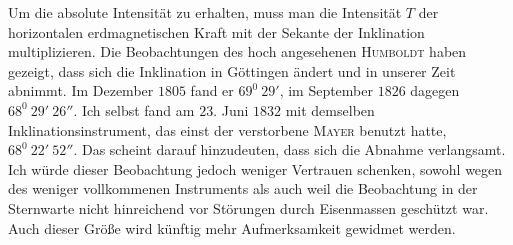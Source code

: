 Um die absolute Intensität zu erhalten, muss man die Intensität $T$ der horizontalen erdmagnetischen Kraft mit der Sekante der Inklination multiplizieren. Die Beobachtungen des hoch angesehenen \textsc{Humboldt} haben gezeigt, dass sich die Inklination in Göttingen ändert und in unserer Zeit abnimmt. Im Dezember $1805$ fand er $69^0\ 29'$, im September $1826$ dagegen $68^0\ 29'\ 26''$. Ich selbst fand am $23$. Juni $1832$ mit demselben Inklinationsinstrument, das einst der verstorbene \textsc{Mayer} benutzt hatte, $68^0\ 22'\ 52''$. Das scheint darauf hinzudeuten, dass sich die Abnahme verlangsamt. Ich würde dieser Beobachtung jedoch weniger Vertrauen schenken, sowohl wegen des weniger vollkommenen Instruments als auch weil die Beobachtung in der Sternwarte nicht hinreichend vor Störungen durch Eisenmassen geschützt war. Auch dieser Größe wird künftig mehr Aufmerksamkeit gewidmet werden.
